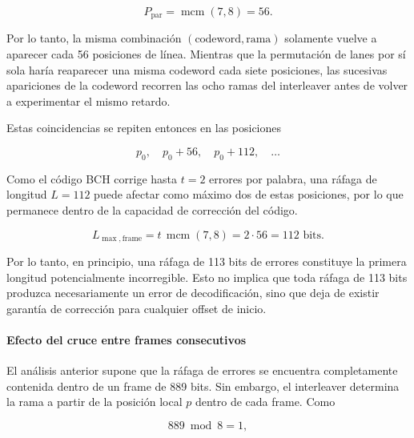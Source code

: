 \documentclass[10pt,a4paper]{article}
\begin{document}
\begin{equation}
    P_{\mathrm{par}}
    =
    \operatorname{mcm}(7,8)
    =
    56.
    \label{eq:periodo-pareja-lane-rama}
\end{equation}

Por lo tanto, la misma combinación $(\text{codeword},\text{rama})$ solamente
vuelve a aparecer cada 56 posiciones de línea. Mientras que la permutación de
lanes por sí sola haría reaparecer una misma codeword cada siete posiciones,
las sucesivas apariciones de la codeword recorren las ocho ramas del interleaver
antes de volver a experimentar el mismo retardo.

Estas coincidencias se repiten entonces en las posiciones

\begin{equation}
    p_0,\quad
    p_0+56,\quad
    p_0+112,\quad\ldots
    \label{eq:posiciones-mismo-codeword-p4}
\end{equation}

Como el código BCH corrige hasta $t=2$ errores por palabra, una ráfaga de
longitud $L=112$ puede afectar como máximo dos de estas posiciones, por lo que
permanece dentro de la capacidad de corrección del código.

\begin{equation}
    L_{\max,\mathrm{frame}}
    =
    t\,\operatorname{mcm}(7,8)
    =
    2\cdot56
    =
    112\text{ bits}.
    \label{eq:rafaga-maxima-p4}
\end{equation}

Por lo tanto, en principio, una ráfaga de 113 bits de errores constituye 
la primera longitud potencialmente incorregible. Esto no implica que toda 
ráfaga de 113 bits produzca necesariamente un error de decodificación, 
sino que deja de existir garantía de corrección para cualquier offset de inicio.

\paragraph{Efecto del cruce entre frames consecutivos}

El análisis anterior supone que la ráfaga de errores se encuentra completamente 
contenida dentro de un frame de 889 bits. Sin embargo, el interleaver determina 
la rama a partir de la posición local $p$ dentro de cada frame. Como

\begin{equation}
    889\bmod8=1,
    \label{eq:frame-mod-b}
\end{equation}
\end{document}

